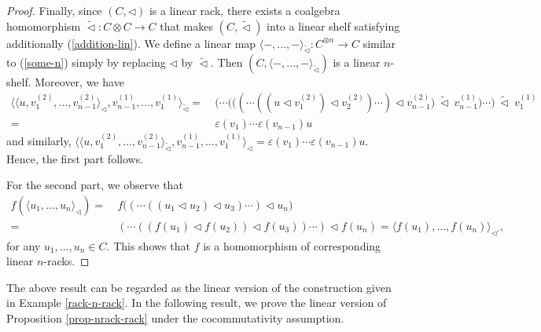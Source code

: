 \documentclass[a4paper,reqno,10pt]{amsart}
\theoremstyle{plain}
\theoremstyle{definition}
\theoremstyle{remark}
\begin{document}
\begin{proof}
  Finally, since $(C, \triangleleft)$ is a linear rack, there exists a coalgebra homomorphism $\widetilde{ \triangleleft} : C \otimes C \rightarrow C$ that makes $(C, \widetilde{\triangleleft})$ into a linear shelf satisfying additionally (\ref{addition-lin}). We define a linear map $\langle -, \ldots, - \rangle_{\widetilde{\triangleleft}} : C^{\otimes n} \rightarrow C$ similar to (\ref{some-n}) simply by replacing $\triangleleft$ by $\widetilde{\triangleleft}$. Then $(C,\langle -, \ldots, - \rangle_{\widetilde{\triangleleft}} )$ is a linear $n$-shelf. Moreover, we have
   \begin{align*}
        \langle \langle u, v_1^{(2)}, \ldots, v_{n-1}^{(2)} \rangle_\triangleleft, v_{n-1}^{(1)}, \ldots, v_1^{(1)} \rangle_{\widetilde{\triangleleft}} 
         =~&    \big( \cdots \big(   \big( (  \cdots   ( (u \triangleleft v_1^{(2)}) \triangleleft v_2^{(2)} ) \cdots ) \triangleleft v_{n-1}^{(2)} \big) ~ \! \widetilde{\triangleleft} ~ \! v_{n-1}^{(1)} \big) \cdots \big) ~ \! \widetilde{\triangleleft} ~ \! v_1^{(1)} \\
         =~& \varepsilon (v_1) \cdots \varepsilon (v_{n-1}) u
   \end{align*}
   and similarly, $ \langle \langle u, v_1^{(2)}, \ldots, v_{n-1}^{(2)} \rangle_{\widetilde{\triangleleft}}, v_{n-1}^{(1)}, \ldots, v_1^{(1)} \rangle_{{\triangleleft}} = \varepsilon (v_1) \cdots \varepsilon (v_{n-1}) u$. Hence, the first part follows.

   For the second part, we observe that
   \begin{align*}
       f ( \langle u_1, \ldots, u_n \rangle_\triangleleft) =~& f \big(    ( \cdots  ((u_1 \triangleleft u_2) \triangleleft u_3) \cdots) \triangleleft u_n   \big) \\
       =~&    ( \cdots  (( f(u_1) \triangleleft f(u_2 )) \triangleleft f(u_3) ) \cdots) \triangleleft f(u_n) =  \langle f(u_1), \ldots, f(u_n) \rangle_{\triangleleft'},
   \end{align*}
   for any $u_1, \ldots, u_n \in C$. This shows that $f$ is a homomorphism of corresponding linear $n$-racks.
\end{proof}

The above result can be regarded as the linear version of the construction given in Example \ref{rack-n-rack}. In the following result, we prove the linear version of Proposition \ref{prop-nrack-rack} under the cocommutativity assumption.
\end{document}
